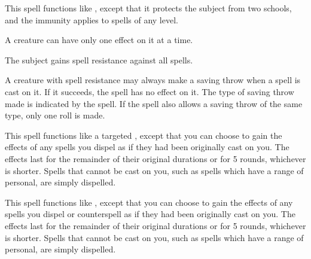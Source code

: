 \begin{spelleffect}
  This spell functions like , except that it protects the subject from two schools, and the immunity applies to spells of any level.
\end{spelleffect}
\begin{spellnotes}
  A creature can have only one  effect on it at a time.
\end{spellnotes}

\spelldur{\durshort}
\begin{spelleffect}
  The subject gains spell resistance against all spells.
\end{spelleffect}
\begin{spellnotes}
  A creature with spell resistance may always make a saving throw when a spell is cast on it. If it succeeds, the spell has no effect on it. The type of saving throw made is indicated by the spell. If the spell also allows a saving throw of the same type, only one roll is made.
\end{spellnotes}

\begin{spelleffect}
  This spell functions like a targeted , except that you can choose to gain the effects of any spells you dispel as if they had been originally cast on you. The effects last for the remainder of their original durations or for 5 rounds, whichever is shorter. Spells that cannot be cast on you, such as spells which have a range of personal, are simply dispelled.
\end{spelleffect}

\begin{spelleffect}
  This spell functions like , except that you can choose to gain the effects of any spells you dispel or counterspell as if they had been originally cast on you. The effects last for the remainder of their original durations or for 5 rounds, whichever is shorter. Spells that cannot be cast on you, such as spells which have a range of personal, are simply dispelled.
\end{spelleffect}


